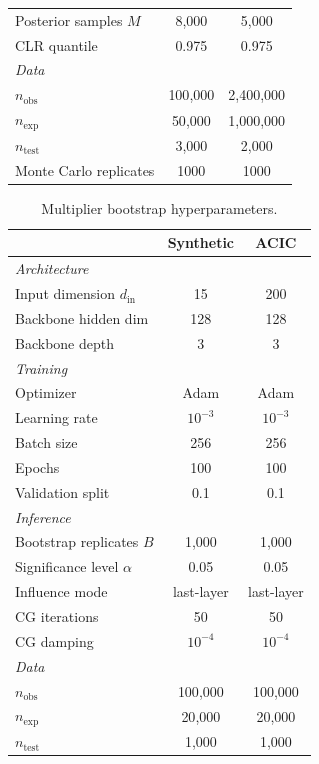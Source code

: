 \documentclass[accepted]{uai2026} %
\theoremstyle{plain}
\theoremstyle{definition}
\theoremstyle{remark}
\begin{document}
\begin{table}[h]
\begin{tabular}{lcc}
Posterior samples $M$
  & 8{,}000
  & 5{,}000 \\
CLR quantile
  & 0.975 & 0.975 \\
\midrule
\multicolumn{3}{l}{\textit{Data}} \\
$n_{\mathrm{obs}}$
  & 100{,}000
  & 2{,}400{,}000 \\
$n_{\mathrm{exp}}$
  & 50{,}000
  & 1{,}000{,}000 \\
$n_{\mathrm{test}}$
  & 3{,}000 & 2{,}000 \\
Monte Carlo replicates
  & 1000 & 1000 \\
\bottomrule
\end{tabular}
\end{table}

\begin{table}[h]
\centering
\caption{Multiplier bootstrap hyperparameters.}
\label{tab:mb-hparams}
\small
\begin{tabular}{lcc}
\toprule
 & \textbf{Synthetic} & \textbf{ACIC} \\
\midrule
\multicolumn{3}{l}{\textit{Architecture}} \\
Input dimension $d_{\mathrm{in}}$
  & 15 & 200 \\
Backbone hidden dim
  & 128 & 128 \\
Backbone depth
  & 3 & 3 \\
\midrule
\multicolumn{3}{l}{\textit{Training}} \\
Optimizer
  & Adam & Adam \\
Learning rate
  & $10^{-3}$
  & $10^{-3}$ \\
Batch size
  & 256 & 256 \\
Epochs
  & 100 & 100 \\
Validation split
  & 0.1 & 0.1 \\
\midrule
\multicolumn{3}{l}{\textit{Inference}} \\
Bootstrap replicates $B$
  & 1{,}000
  & 1{,}000 \\
Significance level $\alpha$
  & 0.05 & 0.05 \\
Influence mode
  & last-layer
  & last-layer \\
CG iterations
  & 50 & 50 \\
CG damping
  & $10^{-4}$
  & $10^{-4}$ \\
\midrule
\multicolumn{3}{l}{\textit{Data}} \\
$n_{\mathrm{obs}}$
  & 100{,}000
  & 100{,}000 \\
$n_{\mathrm{exp}}$
  & 20{,}000
  & 20{,}000 \\
$n_{\mathrm{test}}$
  & 1{,}000
  & 1{,}000 \\
\bottomrule
\end{tabular}
\end{table}
\end{document}
